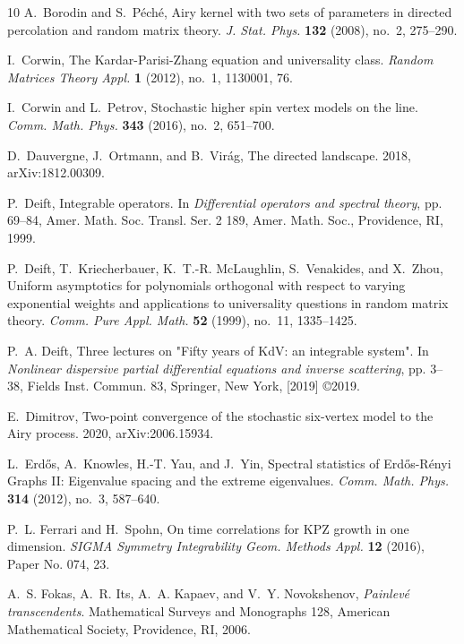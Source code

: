 \documentclass[10pt]{article}
\theoremstyle{plain}
\theoremstyle{definition}
\numberwithin{equation}{section}
\begin{document}
\begin{thebibliography}{10}
A.~Borodin and S.~P{\'e}ch{\'e}, Airy kernel with two sets of parameters in
  directed percolation and random matrix theory. \emph{J. Stat. Phys.}
  \textbf{132} (2008), no.~2, 275--290.

I.~Corwin, The {K}ardar-{P}arisi-{Z}hang equation and universality class.
  \emph{Random Matrices Theory Appl.} \textbf{1} (2012), no.~1, 1130001, 76.

I.~Corwin and L.~Petrov, Stochastic higher spin vertex models on the line.
  \emph{Comm. Math. Phys.} \textbf{343} (2016), no.~2, 651--700.

D.~Dauvergne, J.~Ortmann, and B.~Vir\'ag, The directed landscape. 2018,
  arXiv:1812.00309.

P.~Deift, Integrable operators. In \emph{Differential operators and spectral
  theory}, pp. 69--84, Amer. Math. Soc. Transl. Ser. 2 189, Amer. Math. Soc.,
  Providence, RI, 1999.

P.~Deift, T.~Kriecherbauer, K.~T.-R. McLaughlin, S.~Venakides, and X.~Zhou,
  Uniform asymptotics for polynomials orthogonal with respect to varying
  exponential weights and applications to universality questions in random
  matrix theory. \emph{Comm. Pure Appl. Math.} \textbf{52} (1999), no.~11,
  1335--1425.

P.~A. Deift, Three lectures on "{F}ifty years of {K}d{V}: an integrable
  system". In \emph{Nonlinear dispersive partial differential equations and
  inverse scattering}, pp. 3--38, Fields Inst. Commun. 83, Springer, New York,
  [2019] \copyright 2019.

E.~Dimitrov, Two-point convergence of the stochastic six-vertex model to the
  {A}iry process. 2020, arXiv:2006.15934.

L.~Erd{\H{o}}s, A.~Knowles, H.-T. Yau, and J.~Yin, Spectral statistics of
  {E}rd{\H{o}}s-{R}\'{e}nyi {G}raphs {II}: {E}igenvalue spacing and the extreme
  eigenvalues. \emph{Comm. Math. Phys.} \textbf{314} (2012), no.~3, 587--640.

P.~L. Ferrari and H.~Spohn, On time correlations for {KPZ} growth in one
  dimension. \emph{SIGMA Symmetry Integrability Geom. Methods Appl.}
  \textbf{12} (2016), Paper No. 074, 23.

A.~S. Fokas, A.~R. Its, A.~A. Kapaev, and V.~Y. Novokshenov, \emph{Painlev\'{e}
  transcendents}. Mathematical Surveys and Monographs 128, American
  Mathematical Society, Providence, RI, 2006.


\end{thebibliography}
\end{document}
